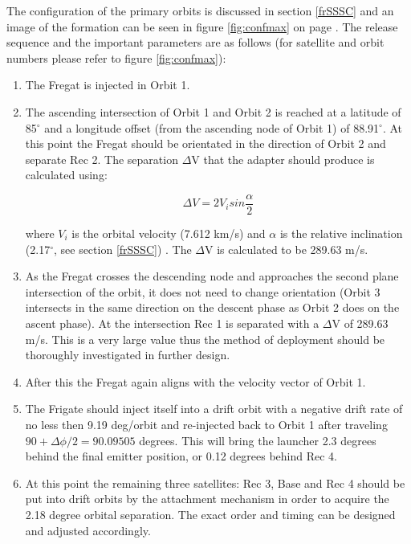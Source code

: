 The configuration of the primary orbits is discussed in section \ref{frSSSC} and an image of the formation can be seen in figure \ref{fig:confmax} on page \pageref{fig:confmax}. The release sequence and the important parameters are as follows (for satellite and orbit numbers please refer to figure \ref{fig:confmax}):

\begin{enumerate}
	\item The Fregat is injected in Orbit 1.
	\item The ascending intersection of Orbit 1 and Orbit 2 is reached at a latitude of 85$^{\circ}$ and a longitude offset (from the ascending node of Orbit 1) of 88.91$^{\circ}$. At this point the Fregat should be orientated in the direction of Orbit 2 and separate Rec 2. The separation $\Delta$V that the adapter should produce is calculated using:
	
	\begin{equation} 
 		\Delta V = 2 V_i sin \frac{\alpha}{2}
	\end{equation}
	
	where $V_i$ is the orbital velocity (7.612 km/s) and $\alpha$ is the relative inclination (2.17$^{\circ}$, see section \ref{frSSSC}) \cite{spacedesign}. The $\Delta$V is calculated to be 289.63 m/s.
	
	\item As the Fregat crosses the descending node and approaches the second plane intersection of the orbit, it does not need to change orientation (Orbit 3 intersects in the same direction on the descent phase as Orbit 2 does on the ascent phase). At the intersection Rec 1 is separated with a $\Delta$V of 289.63 m/s. This is a very large value thus the method of deployment should be thoroughly investigated in further design. 
	\item After this the Fregat again aligns with the velocity vector of Orbit 1.
	\item The Frigate should inject itself into a drift orbit with a negative drift rate of no less then 9.19 deg/orbit and re-injected back to Orbit 1 after traveling $90+\Delta \phi /2 = 90.09505$ degrees. This will bring the launcher 2.3 degrees behind the final emitter position, or 0.12 degrees behind Rec 4.
	\item At this point the remaining three satellites: Rec 3, Base and Rec 4 should be put into drift orbits by the attachment mechanism in order to acquire the 2.18 degree orbital separation. The exact order and timing can be designed and adjusted accordingly.
\end{enumerate}

